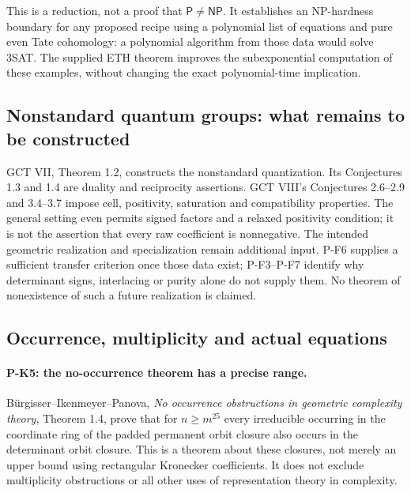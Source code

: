 \documentclass[11pt,a4paper]{article}
\begin{document}
This is a reduction, not a proof that $\mathsf P\ne\mathsf{NP}$.
It establishes an NP-hardness boundary for any proposed recipe using
a polynomial list of equations and pure even Tate cohomology:
a polynomial algorithm from those data would solve 3SAT.
The supplied ETH theorem improves the subexponential computation of
these examples, without changing the exact polynomial-time implication.

\subsection{Nonstandard quantum groups: what remains to be constructed}
GCT VII, Theorem 1.2, constructs the nonstandard quantization.
Its Conjectures 1.3 and 1.4 are duality and reciprocity assertions.
GCT VIII's Conjectures 2.6--2.9 and 3.4--3.7 impose cell, positivity,
saturation and compatibility properties. The general setting even
permits signed factors and a relaxed positivity condition; it is not
the assertion that every raw coefficient is nonnegative.
The intended geometric realization and specialization remain additional
input. P-F6 supplies a sufficient transfer criterion once those data
exist; P-F3--P-F7 identify why determinant signs, interlacing or purity
alone do not supply them. No theorem of nonexistence of such a future
realization is claimed.

\subsection{Occurrence, multiplicity and actual equations}

\paragraph{P-K5: the no-occurrence theorem has a precise range.}
B\"urgisser--Ikenmeyer--Panova, \emph{No occurrence obstructions in
geometric complexity theory}, Theorem 1.4, prove that for
$n\ge m^{25}$ every irreducible occurring in the coordinate ring of
the padded permanent orbit closure also occurs in the determinant
orbit closure. This is a theorem about these closures, not merely an
upper bound using rectangular Kronecker coefficients. It does not
exclude multiplicity obstructions or all other uses of representation
theory in complexity.
\end{document}
